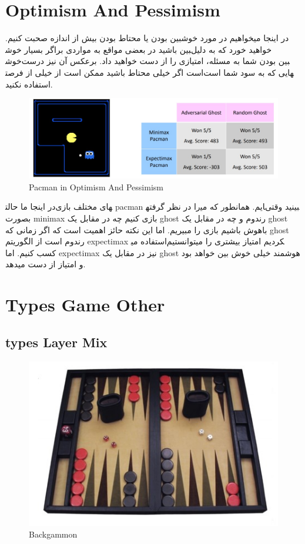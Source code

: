 \section{Optimism And Pessimism}

در اینجا میخواهیم در مورد خوشبین بودن یا محتاط بودن بیش از اندازه صحبت کنیم. اگر بسیار خوش‎بین باشید در بعضی مواقع به مواردی بر‎خواهید خورد که به دلیل خوش‎بین بودن شما به مسئله، امتیازی را از دست خواهید داد. برعکس آن نیز درست است اگر خیلی محتاط باشید ممکن است از خیلی از فرصت‎هایی که به سود شما است استفاده نکنید.


\begin{figure}[h!]
    \centering
    \includegraphics[width=0.8\linewidth]{images/PacmaninOptimismAndPessimism.jpg}
    \caption{Pacman in Optimism And Pessimism}
\end{figure}


در اینجا ما حالت‎های مختلف بازی pacman را در نظر گرفته‎ایم. همانطور که می‎بینید وقتی بصورت minimax بازی کنیم چه در مقابل یک ghost رندوم و چه در مقابل یک ghost باهوش باشیم بازی را مبیریم. اما این نکته حائز اهمیت است که اگر زمانی که ghost رندوم است از الگوریتم expectimax استفاده می‎کردیم امتیاز بیشتری را میتوانستیم کسب کنیم. اما expectimax نیز در مقابل یک ghost هوشمند خیلی خوش بین خواهد بود و امتیاز از دست میدهد.


\section{Types Game Other}

\subsection{types Layer Mix}

\begin{figure}[h!]
    \centering
    \includegraphics[width=0.6\linewidth]{images/backgammon.jpg}
    \caption{Backgammon}
\end{figure}

